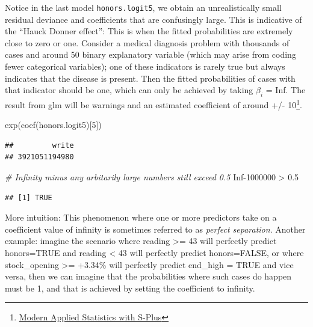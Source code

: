 \documentclass[
]{article}
\newenvironment{Shaded}{\begin{snugshade}}{\end{snugshade}}
\newcommand{\CommentTok}[1]{\textcolor[rgb]{0.56,0.35,0.01}{\textit{#1}}}
\newcommand{\ConstantTok}[1]{\textcolor[rgb]{0.00,0.00,0.00}{#1}}
\newcommand{\DecValTok}[1]{\textcolor[rgb]{0.00,0.00,0.81}{#1}}
\newcommand{\FloatTok}[1]{\textcolor[rgb]{0.00,0.00,0.81}{#1}}
\newcommand{\FunctionTok}[1]{\textcolor[rgb]{0.00,0.00,0.00}{#1}}
\newcommand{\NormalTok}[1]{#1}
\newcommand{\SpecialCharTok}[1]{\textcolor[rgb]{0.00,0.00,0.00}{#1}}
\begin{document}
Notice in the last model \texttt{honors.logit5}, we obtain an
unrealistically small residual deviance and coefficients that are
confusingly large. This is indicative of the ``Hauck Donner effect'':
This is when the fitted probabilities are extremely close to zero or
one. Consider a medical diagnosis problem with thousands of cases and
around 50 binary explanatory variable (which may arise from coding fewer
categorical variables); one of these indicators is rarely true but
always indicates that the disease is present. Then the fitted
probabilities of cases with that indicator should be one, which can only
be achieved by taking \(\beta_i\) = Inf. The result from glm will be
warnings and an estimated coefficient of around +/- 10\footnote{\href{https://books.google.co.id/books?hl=en\&lr=\&id=tovgBwAAQBAJ\&oi=fnd\&pg=PR11\&ots=eWKoGdCjkH\&sig=DGYBL1Mu-JW5qf8xhbfNZxetYLA\&redir_esc=y\#v=onepage\&q\&f=false}{Modern
  Applied Statistics with S-Plus}}.

\begin{Shaded}
\begin{Highlighting}[]
\FunctionTok{exp}\NormalTok{(}\FunctionTok{coef}\NormalTok{(honors.logit5)[}\DecValTok{5}\NormalTok{])}
\end{Highlighting}
\end{Shaded}

\begin{verbatim}
##         write 
## 3921051194980
\end{verbatim}

\begin{Shaded}
\begin{Highlighting}[]
\CommentTok{\# Infinity minus any arbitarily large numbers still exceed 0.5}
\ConstantTok{Inf}\DecValTok{{-}1000000} \SpecialCharTok{\textgreater{}} \FloatTok{0.5}
\end{Highlighting}
\end{Shaded}

\begin{verbatim}
## [1] TRUE
\end{verbatim}

More intuition: This phenomenon where one or more predictors take on a
coefficient value of infinity is sometimes referred to as \emph{perfect
separation}. Another example: imagine the scenario where reading
\textgreater= 43 will perfectly predict honors=TRUE and reading
\textless{} 43 will perfectly predict honors=FALSE, or where
stock\_opening \textgreater= +3.34\% will perfectly predict end\_high =
TRUE and vice versa, then we can imagine that the probabilities where
such cases do happen must be 1, and that is achieved by setting the
coefficient to infinity.
\end{document}
